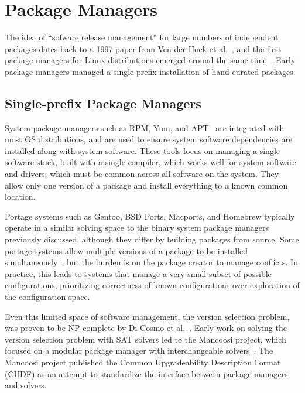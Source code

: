 \section{Package Managers}
\label{sec:pack-managers}

The idea of ``sofware release management'' for large numbers of independent packages dates back to a 1997 paper from Ven der Hoek et al.~\cite{van1997software}, and the first package managers for Linux distributions emerged around the same time~\cite{rpm,apt}. Early package managers managed a single-prefix installation of hand-curated packages.

\subsection{Single-prefix Package Managers}

System package managers such as RPM, Yum, and APT~\cite{foster+:rpm03,silva:apt01,yum} are integrated with most OS distributions, and are used to ensure system software dependencies are installed along with system software.
These tools focus on managing a single software stack, built with a single compiler, which works well for system software and drivers, which must be common across all software on the system.
They allow only one version of a package and install everything to a known common location.

Portage systems such as Gentoo, BSD Ports, Macports, and Homebrew typically operate in a similar solving space to the binary system package managers previously discussed, although they differ by building packages from source.
Some portage systems allow multiple versions of a package to be installed simultaneously~\cite{groffen:gentoo-prefix}, but the burden is on the package creator to manage conflicts.
In practice, this leads to systems that manage a very small subset of possible configurations, prioritizing correctness of known configurations over exploration of the configuration space.

Even this limited space of software management, the version selection problem, was proven to be NP-complete by Di Cosmo et al.~\cite{dicosmo:edos,mancinelli+:ase06-foss-distros}.
Early work on solving the version selection problem with SAT solvers led to the Mancoosi project, which focused on a modular package manager with interchangeable solvers~\cite{abate2012dependency,abate-2013-modular-package-manager}.
The Mancoosi project published the Common Upgradeability Description Format (CUDF) as an attempt to standardize the interface between package managers and solvers.

